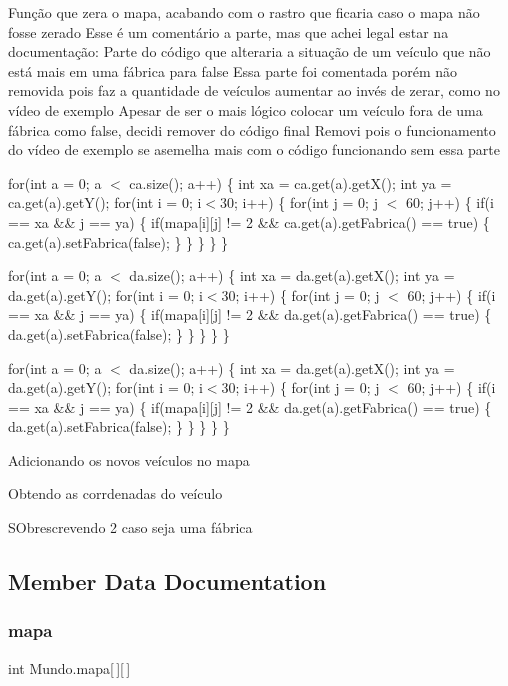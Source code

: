 Função que zera o mapa, acabando com o rastro que ficaria caso o mapa não fosse zerado Esse é um comentário a parte, mas que achei legal estar na documentação\+: Parte do código que alteraria a situação de um veículo que não está mais em uma fábrica para false Essa parte foi comentada porém não removida pois faz a quantidade de veículos aumentar ao invés de zerar, como no vídeo de exemplo Apesar de ser o mais lógico colocar um veículo fora de uma fábrica como false, decidi remover do código final Removi pois o funcionamento do vídeo de exemplo se asemelha mais com o código funcionando sem essa parte

for(int a = 0; a $<$ ca.\+size(); a++) \{ int xa = ca.\+get(a).get\+X(); int ya = ca.\+get(a).get\+Y(); for(int i = 0; i$<$30; i++) \{ for(int j = 0; j $<$ 60; j++) \{ if(i == xa \&\& j == ya) \{ if(mapa\mbox{[}i\mbox{]}\mbox{[}j\mbox{]} != 2 \&\& ca.\+get(a).get\+Fabrica() == true) \{ ca.\+get(a).set\+Fabrica(false); \} \} \} \} \}

for(int a = 0; a $<$ da.\+size(); a++) \{ int xa = da.\+get(a).get\+X(); int ya = da.\+get(a).get\+Y(); for(int i = 0; i$<$30; i++) \{ for(int j = 0; j $<$ 60; j++) \{ if(i == xa \&\& j == ya) \{ if(mapa\mbox{[}i\mbox{]}\mbox{[}j\mbox{]} != 2 \&\& da.\+get(a).get\+Fabrica() == true) \{ da.\+get(a).set\+Fabrica(false); \} \} \} \} \}

for(int a = 0; a $<$ da.\+size(); a++) \{ int xa = da.\+get(a).get\+X(); int ya = da.\+get(a).get\+Y(); for(int i = 0; i$<$30; i++) \{ for(int j = 0; j $<$ 60; j++) \{ if(i == xa \&\& j == ya) \{ if(mapa\mbox{[}i\mbox{]}\mbox{[}j\mbox{]} != 2 \&\& da.\+get(a).get\+Fabrica() == true) \{ da.\+get(a).set\+Fabrica(false); \} \} \} \} \}

Adicionando os novos veículos no mapa

Obtendo as corrdenadas do veículo

S\+Obrescrevendo 2 caso seja uma fábrica 

\subsection{Member Data Documentation}
\mbox{\label{classMundo_a8332b2d52b9f317338a4d6cbe10bbcbb}} 
\subsubsection{\texorpdfstring{mapa}{mapa}}
{\footnotesize\ttfamily int Mundo.\+mapa\mbox{[}$\,$\mbox{]}\mbox{[}$\,$\mbox{]}}

